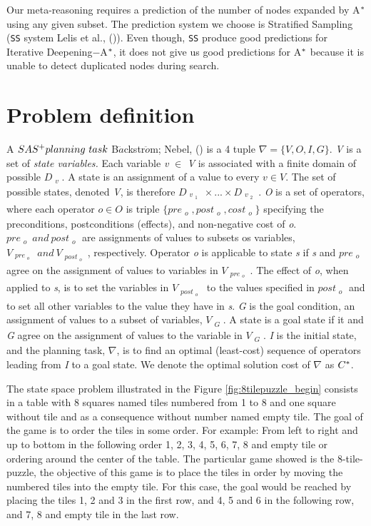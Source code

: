 Our meta-reasoning requires a prediction of the number of nodes expanded by A$\sp{*}$ using any given subset. The prediction system we choose is Stratified Sampling (\texttt{SS} system Lelis et al., (\citeyear{lelis2013predicting})). Even though, \texttt{SS} produce good predictions for Iterative Deepening$-$A$\sp{*}$, it does not give us good predictions for A$\sp{*}$ because it is unable to detect duplicated nodes during search.

\section{Problem definition}

A $SAS\sp{+} planning\ task$ B$\ddot{a}$ckstr$\ddot{o}$m; Nebel, (\citeyear{backstrom1995complexity}) is a 4 tuple $\nabla = \{V, O, I, G\}.$ \textit{V} is a set of \textit{state variables.} Each variable \textit{v} $\in$ \textit{V} is associated with a finite domain of possible $D_{\substack{v}}$. A state is an assignment of a value to every $v \in V.$ The set of possible states, denoted \textit{V}, is therefore $D_{\substack{v_{\substack{1}}}}    \times ... \times D_{\substack{v_{\substack{2}}}}$. \textit{O} is a set of operators, where each operator $o \in O$ is triple $\{pre_{\substack{o}} , post_{\substack{o}}, cost_{\substack{o}}\}$ specifying the preconditions, postconditions (effects), and non-negative cost of \textit{o}. $pre_{\substack{o}}\ and\ post_{\substack{o}}$ are assignments of values to subsets os variables, $V_{\substack{pre_{\substack{o}}}}\ and\ V_{\substack{post_{\substack{o}}}}$, respectively. Operator \textit{o} is applicable to state \textit{s} if \textit{s} and $pre_{\substack{o}}$ agree on the assignment of values to variables in $V_{\substack{pre_{\substack{o}}}}$. The effect of \textit{o}, when applied to \textit{s}, is to set the variables in $V_{\substack{post_{\substack{o}}}}$ to the values specified in $post_{\substack{o}}$ and to set all other variables to the value they have in \textit{s}. \textit{G} is the goal condition, an assignment of values to a subset of variables, $V_{\substack{G}}$. A state is a goal state if it and \textit{G} agree on the assignment of values to the variable in $V_{\substack{G}}$. \textit{I} is the initial state, and the planning task, $\nabla$, is to find an optimal (least-cost) sequence of operators leading from \textit{I} to a goal state. We denote the optimal solution cost of $\nabla$ as $C\sp{*}$. 

The state space problem illustrated in the Figure \ref{fig:8tilepuzzle_begin} consists in a table with 8 squares named tiles numbered from 1 to 8 and one square without tile and as a consequence without number named empty tile. The goal of the game is to order the tiles in some order. For example: From left to right and up to bottom in the following order 1, 2, 3, 4, 5, 6, 7, 8 and empty tile or ordering around the center of the table. The particular game showed is the 8-tile-puzzle, the objective of this game is to place the tiles in order by moving the numbered tiles into the empty tile. For this case, the goal would be reached by placing the tiles 1, 2 and 3 in the first row, and 4, 5 and 6 in the following row, and 7, 8 and empty tile in the last row.

